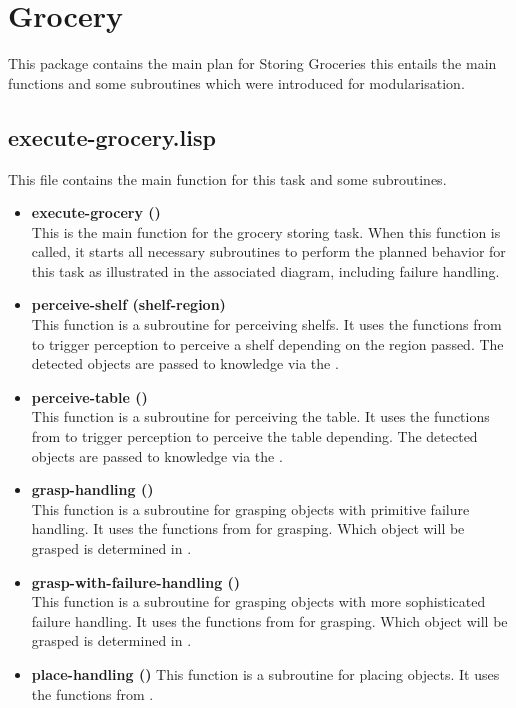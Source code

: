 \documentclass[main.tex]{subfiles}
\begin{document}
		\section{Grocery}
		\label{grocery}
		This package contains the main plan for Storing Groceries this entails the main functions and some subroutines which were introduced for modularisation. 
		\subsection{execute-grocery.lisp}
		This file contains the main function for this task and some subroutines.
		\begin{itemize}
			\item \textbf{execute-grocery ()} \\
			This is the main function for the grocery storing task. When this function is called, it starts all necessary subroutines to perform the planned behavior for this task as illustrated in the associated diagram, including failure handling.
			\item \textbf{perceive-shelf (shelf-region)} \\
			This function is a subroutine for perceiving shelfs. It uses the functions from  to trigger perception to perceive a shelf depending on the region passed. The detected objects are passed to knowledge via the .
			\item \textbf{perceive-table ()} \\
			This function is a subroutine for perceiving the table. It uses the functions from  to trigger perception to perceive the table depending. The detected objects are passed to knowledge via the .
			\item \textbf{grasp-handling ()} \\
			This function is a subroutine for grasping objects with primitive failure handling. It uses the functions from  for grasping. Which object will be grasped is determined in .
			\item \textbf{grasp-with-failure-handling ()} \\
			This function is a subroutine for grasping objects with more sophisticated failure handling. It uses the functions from  for grasping. Which object will be grasped is determined in .
			\item \textbf{place-handling ()}
			This function is a subroutine for placing objects. It uses the functions from .
		\end{itemize}
		
\end{document}
